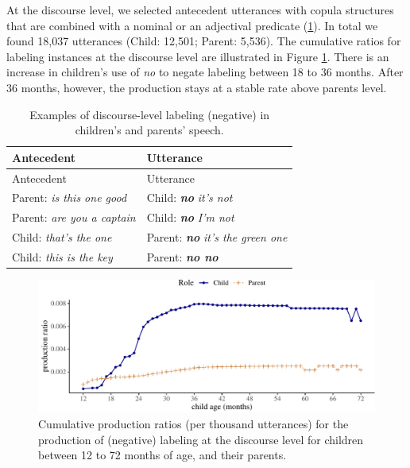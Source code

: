 \documentclass[
  man,floatsintext]{apa6}
\begin{document}
At the discourse level, we selected antecedent utterances with copula structures that are combined with a nominal or an adjectival predicate (\ref{tab:dislabel}). In total we found 18,037 utterances (Child: 12,501; Parent: 5,536). The cumulative ratios for labeling instances at the discourse level are illustrated in Figure \ref{fig:learningdiscourse}. There is an increase in children's use of \emph{no} to negate labeling between 18 to 36 months. After 36 months, however, the production stays at a stable rate above parents level.

\begin{longtable}[]{@{}ll@{}}
\caption{\label{tab:dislabel} Examples of discourse-level labeling (negative) in children's and parents' speech.}\tabularnewline
\toprule\noalign{}
Antecedent & Utterance \\
\midrule\noalign{}
\endfirsthead
\toprule\noalign{}
Antecedent & Utterance \\
\midrule\noalign{}
\endhead
\bottomrule\noalign{}
\endlastfoot
Parent: \emph{is this one good} & Child: \textbf{\emph{no}} \emph{it's not} \\
Parent: \emph{are you a captain} & Child: \textbf{\emph{no}} \emph{I'm not} \\
Child: \emph{that's the one} & Parent: \textbf{\emph{no}} \emph{it's the green one} \\
Child: \emph{this is the key} & Parent: \textbf{\emph{no no}} \\
\end{longtable}

\begin{figure}[H]

{\centering \includegraphics{neg_construction_article_files/figure-latex/learningdiscourse-1} 

}

\caption{Cumulative production ratios (per thousand utterances) for the production of (negative) labeling at the discourse level for children between 12 to 72 months of age, and their parents.}\label{fig:learningdiscourse}
\end{figure}
\end{document}

